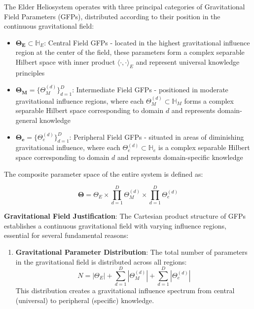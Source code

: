 \begin{definition}
The Elder Heliosystem operates with three principal categories of Gravitational Field Parameters (GFPs), distributed according to their position in the continuous gravitational field:

\begin{itemize}
    \item $\boldsymbol{\Theta_E} \subset \mathbb{H}_E$: Central Field GFPs - located in the highest gravitational influence region at the center of the field, these parameters form a complex separable Hilbert space with inner product $\langle \cdot, \cdot \rangle_E$ and represent universal knowledge principles
    
    \item $\boldsymbol{\Theta_M} = \{\Theta_M^{(d)}\}_{d=1}^D$: Intermediate Field GFPs - positioned in moderate gravitational influence regions, where each $\Theta_M^{(d)} \subset \mathbb{H}_M$ forms a complex separable Hilbert space corresponding to domain $d$ and represents domain-general knowledge
    
    \item $\boldsymbol{\Theta_e} = \{\Theta_e^{(d)}\}_{d=1}^D$: Peripheral Field GFPs - situated in areas of diminishing gravitational influence, where each $\Theta_e^{(d)} \subset \mathbb{H}_e$ is a complex separable Hilbert space corresponding to domain $d$ and represents domain-specific knowledge
\end{itemize}

The composite parameter space of the entire system is defined as:

\begin{equation}
\boldsymbol{\Theta} = \Theta_E \times \prod_{d=1}^D \Theta_M^{(d)} \times \prod_{d=1}^D \Theta_e^{(d)}
\end{equation}

\textbf{Gravitational Field Justification}: The Cartesian product structure of GFPs establishes a continuous gravitational field with varying influence regions, essential for several fundamental reasons:
\begin{enumerate}
    \item \textbf{Gravitational Parameter Distribution}: The total number of parameters in the gravitational field is distributed across all regions:
    \begin{equation}
    N = |\Theta_E| + \sum_{d=1}^D |\Theta_M^{(d)}| + \sum_{d=1}^D |\Theta_e^{(d)}|
    \end{equation}
    This distribution creates a gravitational influence spectrum from central (universal) to peripheral (specific) knowledge.
    

\end{enumerate}
\end{definition}
